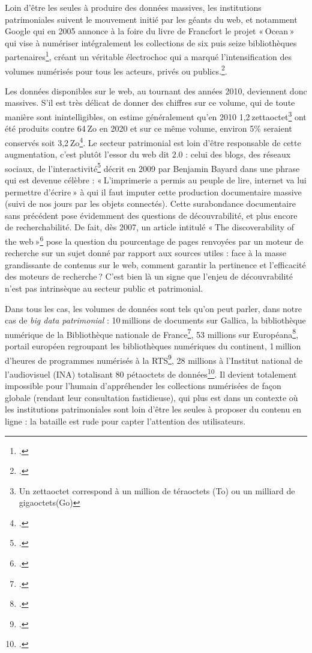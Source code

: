 Loin d’être les seules à produire des données massives, les institutions patrimoniales suivent le mouvement initié par les géants du web, et notamment Google qui en 2005 annonce à la foire du livre de Francfort le projet « Ocean » qui vise à numériser intégralement les collections de six puis seize bibliothèques partenaires\footcite{ertzscheid2019}, créant un véritable électrochoc qui a marqué l'intensification des volumes numérisés pour tous les acteurs, privés ou publics.\footcite{bermes2024}.

Les données disponibles sur le web, au tournant des années 2010, deviennent donc massives. S’il est très délicat de donner des chiffres sur ce volume, qui de toute manière sont inintelligibles, on estime généralement qu’en 2010 1,2 zettaoctet\footnote{Un zettaoctet correspond à un million de téraoctets (To) ou un milliard de gigaoctets(Go)} ont été produits contre 64 Zo en 2020 et sur ce même volume, environ 5\% seraient conservés soit 3,2 Zo\footcite{zotero-284}. Le secteur patrimonial est loin d’être responsable de cette augmentation, c’est plutôt l’essor du web dit 2.0 : celui des blogs, des réseaux sociaux, de l’interactivité\footcite{zotero-283} décrit en 2009 par Benjamin Bayard dans une phrase qui est devenue célèbre : « L’imprimerie a permis au peuple de lire, internet va lui permettre d’écrire » à qui il faut imputer cette production documentaire massive (suivi de nos jours par les objets connectés). Cette surabondance documentaire sans précédent pose évidemment des questions de découvrabilité, et plus encore de recherchabilité. De fait, dès 2007, un article intitulé « The discoverability of the web »\footcite{dasgupta2007} pose la question du pourcentage de pages renvoyées par un moteur de recherche sur un sujet donné par rapport aux sources utiles : face à la masse grandissante de contenus sur le web, comment garantir la pertinence et l’efficacité des moteurs de recherche ? C’est bien là un signe que l’enjeu de découvrabilité n’est pas intrinsèque au secteur public et patrimonial.

Dans tous les cas, les volumes de données sont tels qu’on peut parler, dans notre cas de \textit{big data patrimonial} : 10 millions de documents sur Gallica, la bibliothèque numérique de la Bibliothèque nationale de France\footcite{zotero-281}, 53 millions sur Européana\footcite{zotero-280}, portail européen regroupant les bibliothèques numériques du continent, 1 million d’heures de programmes numérisés à la RTS\footcite{sonderegger2024}, 28 millions à l’Institut national de l’audiovisuel (INA) totalisant 80 pétaoctets de données\footcite{alquier2024}. Il devient totalement impossible pour l’humain d’appréhender les collections numérisées de façon globale (rendant leur consultation fastidieuse), qui plus est dans un contexte où les institutions patrimoniales sont loin d’être les seules à proposer du contenu en ligne : la bataille est rude pour capter l’attention des utilisateurs.


